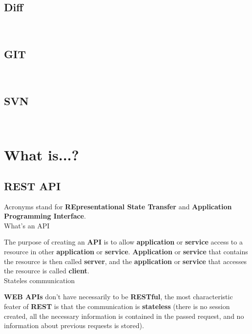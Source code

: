 \fbox{\textcolor{red}{populate with content}}\\

\section{Diff}

\fbox{\textcolor{red}{populate with content}}\\

\section{GIT}

\fbox{\textcolor{red}{populate with content}}\\

\section{SVN}

\fbox{\textcolor{red}{populate with content}}\\

\chapter{What is...?}

\section{REST API}


Acronyms stand for \textbf{REpresentational State Transfer} and \textbf{Application Programming Interface}.\\

What's an API

The purpose of creating an \textbf{API} is to allow \textbf{application} or \textbf{service} access to a resource in other \textbf{application} or \textbf{service}. \textbf{Application} or \textbf{service }that contains the resource is then called \textbf{server}, and the \textbf{application} or \textbf{service} that accesses the resource is called \textbf{client}.\\

Stateles communication

\textbf{WEB APIs} don't have necessarily to be \textbf{RESTful}, the most characteristic feater of \textbf{REST} is that the communication is \textbf{stateless} (there is no session created, all the necessary information is contained in the passed request, and no information about previous requests is stored).\\

